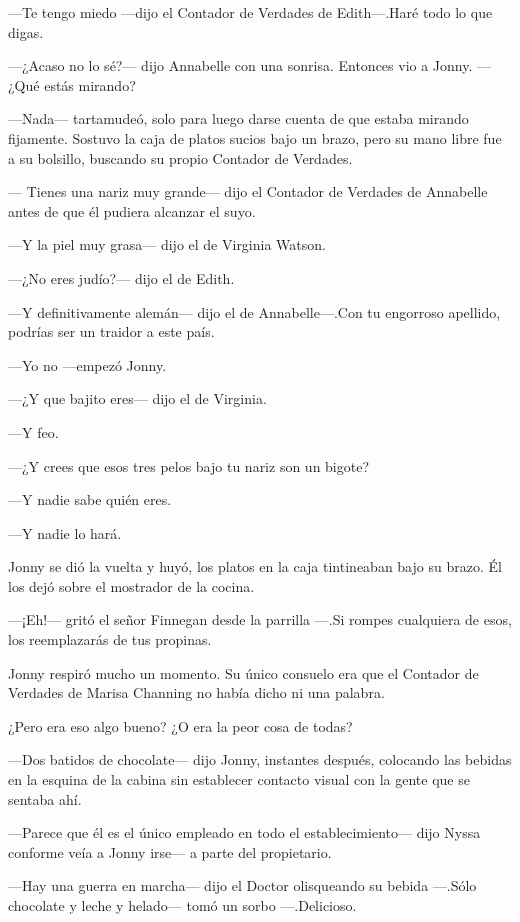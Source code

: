 ---Te tengo miedo ---dijo el Contador de Verdades de Edith---.Haré todo
lo que digas.

---¿Acaso no lo sé?--- dijo Annabelle con una sonrisa. Entonces vio a
Jonny. ---¿Qué estás mirando?

---Nada--- tartamudeó, solo para luego darse cuenta de que estaba
mirando fijamente. Sostuvo la caja de platos sucios bajo un brazo, pero
su mano libre fue a su bolsillo, buscando su propio Contador de
Verdades.

--- Tienes una nariz muy grande--- dijo el Contador de Verdades de
Annabelle antes de que él pudiera alcanzar el suyo.

---Y la piel muy grasa--- dijo el de Virginia Watson.

---¿No eres judío?--- dijo el de Edith.

---Y definitivamente alemán--- dijo el de Annabelle---.Con tu engorroso
apellido, podrías ser un traidor a este país.

---Yo no ---empezó Jonny.

---¿Y que bajito eres--- dijo el de Virginia.

---Y feo.

---¿Y crees que esos tres pelos bajo tu nariz son un bigote?

---Y nadie sabe quién eres.

---Y nadie lo hará.

Jonny se dió la vuelta y huyó, los platos en la caja tintineaban bajo su
brazo. Él los dejó sobre el mostrador de la cocina.

---¡Eh!--- gritó el señor Finnegan desde la parrilla ---.Si rompes
cualquiera de esos, los reemplazarás de tus propinas.

Jonny respiró mucho un momento. Su único consuelo era que el Contador de
Verdades de Marisa Channing no había dicho ni una palabra.

¿Pero era eso algo bueno? ¿O era la peor cosa de todas?

---Dos batidos de chocolate--- dijo Jonny, instantes después, colocando
las bebidas en la esquina de la cabina sin establecer contacto visual
con la gente que se sentaba ahí.

---Parece que él es el único empleado en todo el establecimiento--- dijo
Nyssa conforme veía a Jonny irse--- a parte del propietario.

---Hay una guerra en marcha--- dijo el Doctor olisqueando su bebida
---.Sólo chocolate y leche y helado--- tomó un sorbo ---.Delicioso.

